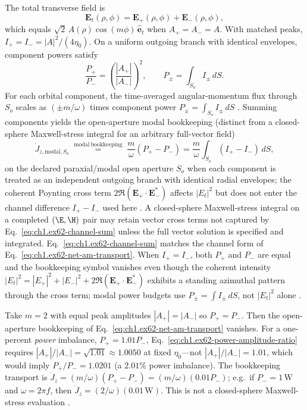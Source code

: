 The total transverse field is
\begin{equation}
\label{eq:ch1.ex62-counter-rotating-superposition}
\mathbf{E}_t(\rho,\phi)
=
\mathbf{E}_+(\rho,\phi)+\mathbf{E}_-(\rho,\phi),
\end{equation}
which equals $\sqrt{2}\,A(\rho)\cos(m\phi)\,\hat{\mathbf{e}}_t$ when $A_+=A_-=A$.
With matched peaks, $I_+=I_-=|A|^2/(4\eta_0)$. On a uniform outgoing branch with identical envelopes, component powers satisfy
\begin{equation}
\label{eq:ch1.ex62-power-amplitude-ratio}
\frac{P_+}{P_-}=\left(\frac{|A_+|}{|A_-|}\right)^2,
\qquad
P_\pm=\int_{S_o} I_\pm\,dS.
\end{equation}
For each orbital component, the time-averaged angular-momentum flux through \(S_o\)
scales as \((\pm m/\omega)\) times component power
\(P_\pm = \int_{S_o} I_\pm\,dS\) \cite{stratton1941}. Summing components yields the open-aperture modal bookkeeping (distinct from a closed-sphere Maxwell-stress integral for an arbitrary full-vector field)
\begin{equation}
\label{eq:ch1.ex62-channel-sum}
\dot J_{z,\mathrm{modal},S_o}
\;\stackrel{\mathrm{modal\ bookkeeping}}{=}\;
\frac{m}{\omega}(P_+ - P_-)
=
\frac{m}{\omega}\int_{S_o}(I_+-I_-)\,dS,
\end{equation}
on the declared paraxial/modal open aperture \(S_o\) when each component is treated as an independent outgoing branch with identical radial envelopes; the coherent Poynting cross term \(2\Re(\mathbf{E}_+\cdot\mathbf{E}_-^*)\) affects $|E_t|^2$ but does not enter the channel difference \(I_+-I_-\) used here \cite{stratton1941,allen1992}. A closed-sphere Maxwell-stress integral on a completed \((\E,\H)\) pair may retain vector cross terms not captured by Eq.~\eqref{eq:ch1.ex62-channel-sum} unless the full vector solution is specified and integrated. Eq.~\eqref{eq:ch1.ex62-channel-sum} matches the channel form of Eq.~\eqref{eq:ch1.ex62-net-am-transport}. When \(I_+=I_-\), both \(P_+\) and
\(P_-\) are equal and the bookkeeping symbol vanishes even though the coherent intensity
\(|E_t|^2=|E_+|^2+|E_-|^2+2\Re(\mathbf{E}_+\cdot\mathbf{E}_-^*)\) exhibits a standing azimuthal pattern through the cross term; modal power budgets use \(P_\pm=\int I_\pm\,dS\), not \(|E_t|^2\) alone \cite{stratton1941,allen1992}.

\begin{example}
\label{ex:ch1.counter-rotating-numeric}
Take $m=2$ with equal peak amplitudes $|A_+|=|A_-|$ so $P_+=P_-$. Then the open-aperture bookkeeping of Eq.~\eqref{eq:ch1.ex62-net-am-transport} vanishes. For a one-percent \emph{power} imbalance, $P_+=1.01P_-$, Eq.~\eqref{eq:ch1.ex62-power-amplitude-ratio} requires $|A_+|/|A_-|=\sqrt{1.01}\approx 1.0050$ at fixed $\eta_0$---not $|A_+|/|A_-|=1.01$, which would imply $P_+/P_-=1.0201$ (a $2.01\%$ power imbalance). The bookkeeping transport is $\dot J_z=(m/\omega)(P_+-P_-)=(m/\omega)(0.01P_-)$; e.g.\ if $P_-=1\,\mathrm{W}$ and $\omega=2\pi f$, then $\dot J_z=(2/\omega)(0.01\,\mathrm{W})$. This is not a closed-sphere Maxwell-stress evaluation \cite{allen1992}.
\end{example}

